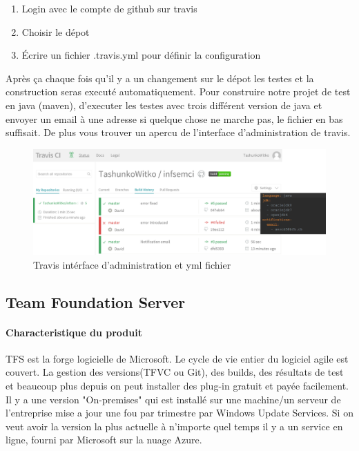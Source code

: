 \begin{enumerate}
	\item Login avec le compte de github sur travis
	\item Choisir le dépot
	\item Écrire un fichier .travis.yml pour définir la configuration
\end{enumerate}

Après ça chaque fois qu'il y a un changement sur le dépot les testes et la construction seras executé automatiquement. Pour construire notre projet de test en java (maven), d'executer les testes avec trois différent version de java et envoyer un email à une adresse si quelque chose ne marche pas, le fichier en bas suffisait. De plus vous trouver un apercu de l'interface d'administration de travis.

\begin{figure}[H]
	\centering
		\includegraphics[scale=0.2]{bilder/travisciymlfile}
	\caption{Travis intérface d'administration et yml fichier}
	\label{fig:travisgui}
\end{figure}





\clearpage
\subsection{Team Foundation Server}
\paragraph{Characteristique du produit} TFS est la forge logicielle de Microsoft. Le cycle de vie entier du logiciel agile est couvert. La gestion des versions(TFVC ou Git), des builds, des résultats de test et beaucoup plus depuis on peut installer des plug-in gratuit et payée facilement. Il y a une version "On-premises" qui est installé sur une machine/un serveur de l'entreprise mise a jour une fou par trimestre par Windows Update Services. Si on veut avoir la version la plus actuelle à n'importe quel temps il y a un service en ligne, fourni par Microsoft sur la nuage Azure.

